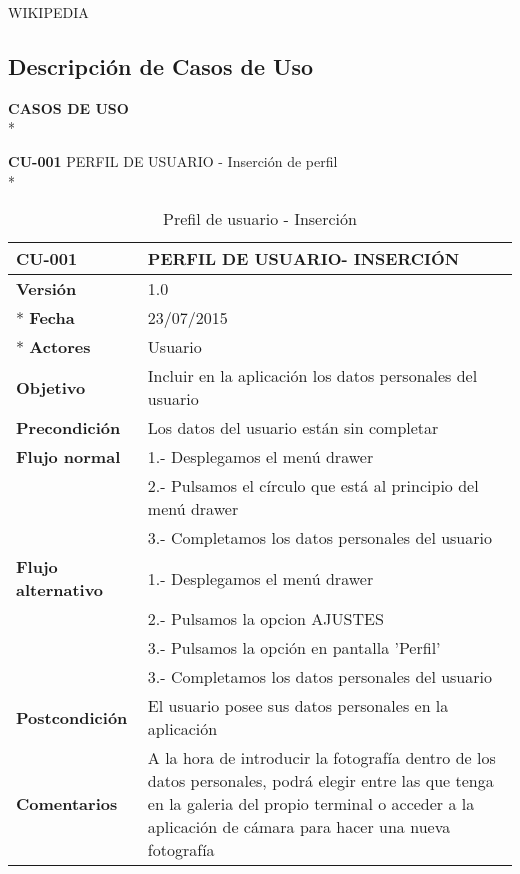 \documentclass[../pfc.tex]{subfiles}
\begin{document}
	WIKIPEDIA


	\subsection{Descripción de Casos de Uso}
	
	\textbf{CASOS DE USO}\\*
	
	\textbf{CU-001} PERFIL DE USUARIO - Inserción de perfil\\*
	
	\begin{table}[H]
		\centering
		\begin{tabular}[t]{|p{3cm}|p{9.5cm}|}
				\hline \textbf{CU-001} & \textbf{PERFIL DE USUARIO- INSERCIÓN} \\*
				\hline\hline \textbf{Versión} & 1.0 \\ *
				\hline\hline \textbf{Fecha} & 23/07/2015 \\ *
				\hline\textbf{Actores} 	& Usuario\\*
				\hline \textbf{Objetivo} & Incluir en la aplicación los datos personales del usuario\\* 			
				\hline \textbf{Precondición} & Los datos del usuario están sin completar \\* 
				\hline \textbf{Flujo normal} & 1.- Desplegamos el menú drawer \\* 
											 & 2.- Pulsamos el círculo que está al principio del menú drawer \\*	
											 & 3.- Completamos los datos personales del usuario\\*	
				\hline \textbf{Flujo alternativo} & 1.- Desplegamos el menú drawer \\* 
 												  & 2.- Pulsamos la opcion AJUSTES \\*	
												  & 3.- Pulsamos la opción en pantalla 'Perfil' \\*	
												  & 3.- Completamos los datos personales del usuario \\*	
				\hline \textbf{Postcondición} & El usuario posee sus datos personales en la aplicación \\* 
				\hline \textbf{Comentarios}   & A la hora de introducir la fotografía dentro de los datos personales, podrá elegir entre las que tenga en la galeria del propio terminal o acceder a la aplicación de cámara para hacer una nueva fotografía\\*
				\hline
			\end{tabular}
			\caption{Prefil de usuario - Inserción}
			\label{tabla:caso001}
	\end{table}
		
\end{document}

